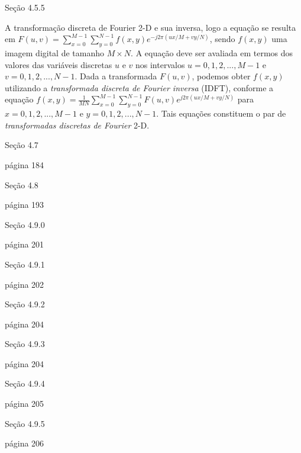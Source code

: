 \documentclass[12pt,a4paper]{article}
\begin{document}
\begin{solution}
\begin{tasks}
        \task Seção 4.5.5
        
        A transformação discreta de Fourier 2-D e sua inversa, logo a equação se
        resulta em
        $F(u,v)=\sum_{x=0}^{M-1}\sum_{y=0}^{N-1}f(x,y)e^{-j2{\pi}(ux/M+vy/N)}$,
        sendo $f(x,y)$ uma imagem digital de tamanho $M \times N$. A equação
        deve ser avaliada em termos dos valores das variáveis discretas $u$ e
        $v$ nos intervalos $u = 0, 1, 2, ..., M-1$ e $v = 0, 1, 2, ..., N-1$.
        Dada a transformada $F(u,v)$, podemos obter $f(x,y)$ utilizando a
        \textit{transformada discreta de Fourier inversa} (IDFT), conforme a
        equação
        $f(x,y)=\frac{1}{MN}\sum_{x=0}^{M-1}\sum_{y=0}^{N-1}F(u,v)e^{j2{\pi}(ux/M+vy/N)}$
        para $x = 0, 1, 2, ..., M-1$ e $y = 0, 1, 2, ..., N-1$. Tais equações
        constituem o par de \textit{transformadas discretas de Fourier} 2-D.

        \task Seção 4.7

        página 184  

        \task Seção 4.8

        página 193 

        \task Seção 4.9.0

        página 201

        \task Seção 4.9.1

        página 202

        \task Seção 4.9.2

        página 204

        \task Seção 4.9.3

        página 204

        \task Seção 4.9.4

        página 205

        \task Seção 4.9.5

        página 206

    \end{tasks}
\end{solution}


\pagebreak
\medskip
\printbibliography[
    heading=bibintoc,
    title={Referências Bibliográficas}
]
\end{document}
